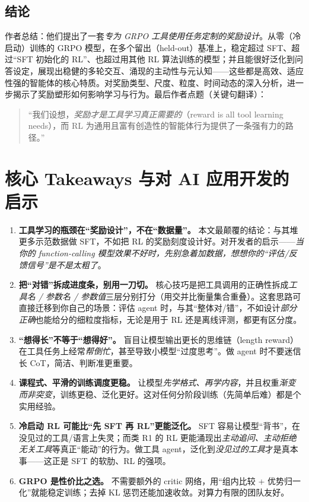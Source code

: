 \documentclass[11pt,UTF8,fontset=fandol]{ctexart}
\begin{document}
\subsection{结论}

作者总结：他们提出了一套\emph{专为 GRPO 工具使用任务定制的奖励设计}。从零（冷启动）训练的 GRPO 模型，在多个留出（held-out）基准上，稳定超过 SFT、超过“SFT 初始化的 RL”、也超过用其他 RL 算法训练的模型；并且能很好泛化到问答设定，展现出稳健的多轮交互、涌现的主动性与元认知——这些都是高效、适应性强的智能体的核心特质。对奖励类型、尺度、粒度、时间动态的深入分析，进一步揭示了奖励塑形如何影响学习与行为。最后作者点题（关键句翻译）：

\begin{quote}\small
“我们设想，\emph{奖励才是工具学习真正需要的}（reward is all tool learning needs），而 RL 为通用且富有创造性的智能体行为提供了一条强有力的路径。”
\end{quote}

\section{核心 Takeaways 与对 AI 应用开发的启示}

\begin{enumerate}[leftmargin=1.6em]
\item \textbf{工具学习的瓶颈在“奖励设计”，不在“数据量”。} 本文最颠覆的结论：与其堆更多示范数据做 SFT，不如把 RL 的奖励刻度设计好。对开发者的启示——\emph{当你的 function-calling 模型效果不好时，先别急着加数据，想想你的“评估/反馈信号”是不是太粗了}。

\item \textbf{把“对错”拆成进度条，别用一刀切。} 核心技巧是把工具调用的正确性拆成\emph{工具名 / 参数名 / 参数值}三层分别打分（用交并比衡量集合重叠）。这套思路可直接迁移到你自己的场景：评估 agent 时，与其“整体对/错”，不如设计\emph{部分正确}也能给分的细粒度指标，无论是用于 RL 还是离线评测，都更有区分度。

\item \textbf{“想得长”不等于“想得好”。} 盲目让模型输出更长的思维链（length reward）在工具任务上经常\emph{帮倒忙}，甚至导致小模型“过度思考”。做 agent 时不要迷信长 CoT，简洁、判断准更重要。

\item \textbf{课程式、平滑的训练调度更稳。} 让模型\emph{先学格式、再学内容}，并且权重\emph{渐变而非突变}，训练更稳、泛化更好。这对任何分阶段训练（先简单后难）都是个实用经验。

\item \textbf{冷启动 RL 可能比“先 SFT 再 RL”更能泛化。} SFT 容易让模型“背书”，在没见过的工具/语言上失灵；而类 R1 的 RL 更能涌现出\emph{主动追问、主动拒绝无关工具}等真正“能动”的行为。做工具 agent，泛化到\emph{没见过的工具}才是真本事——这正是 SFT 的软肋、RL 的强项。

\item \textbf{GRPO 是性价比之选。} 不需要额外的 critic 网络，用“组内比较 + 优势归一化”就能稳定训练；去掉 KL 惩罚还能加速收敛。对算力有限的团队友好。
\end{enumerate}
\end{document}
